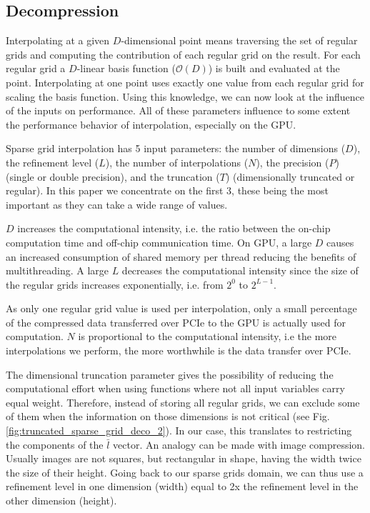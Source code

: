 \subsection{Decompression}

Interpolating at a given $D$-dimensional point means traversing the set of
regular grids and computing the contribution of each regular grid on the result. For
each regular grid a $D$-linear basis function ($\mathcal{O}(D)$) is built and
evaluated at the point. Interpolating at one point uses exactly one value from each
regular grid for scaling the basis function. Using this knowledge, we can now
look at the influence of the inputs on performance. All of these parameters
influence to some extent the performance behavior of interpolation, especially
on the GPU.

Sparse grid interpolation has 5 input parameters: the number of dimensions
($D$), the refinement level ($L$), the number of interpolations ($N$), the
precision ($P$) (single or double precision), and the truncation ($T$)
(dimensionally truncated or regular). In this paper we concentrate on the first
3, these being the most important as they can take a wide range of values.

$D$ increases the computational intensity, i.e. the ratio between the on-chip
computation time and off-chip communication time. On GPU, a large $D$ causes an
increased consumption of shared memory per thread reducing the benefits of
multithreading. A large $L$ decreases the computational intensity since the size
of the regular grids increases exponentially, i.e. from $2^0$ to $2^{L-1}$. 

As only one regular grid value is used per interpolation, only a small
percentage of the compressed data transferred over PCIe to the GPU is actually
used for computation. $N$ is proportional to the computational intensity, i.e
the more interpolations we perform, the more worthwhile is the data transfer over
PCIe.

The dimensional truncation parameter gives the possibility of reducing the
computational effort when using functions where not all input variables carry
equal weight. Therefore, instead of storing all regular grids, we can exclude
some of them when the information on those dimensions is not critical (see Fig.
\ref{fig:truncated_sparse_grid_deco_2}). In our case, this translates to
restricting the components of the $\bar{l}$ vector. An analogy can be made with
image compression. Usually images are not squares, but rectangular in shape,
having the width twice the size of their height. Going back to our sparse grids
domain, we can thus use a refinement level in one dimension (width) equal to 2x
the refinement level in the other dimension (height).

